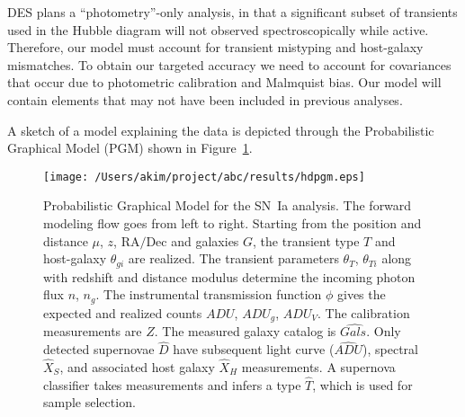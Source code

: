 \documentclass[preprint]{aastex}
\begin{document}
DES plans a ``photometry''-only analysis, in that a significant subset of transients used
in the Hubble diagram will not observed spectroscopically while active.  Therefore,
our model must account for transient mistyping and host-galaxy mismatches.  To obtain
our targeted
accuracy we need to account for covariances that occur due to photometric
calibration and Malmquist bias.  Our model will contain elements that may not
have been included in previous analyses. 

A sketch of a model explaining the data is depicted through the Probabilistic Graphical Model
(PGM)
shown in Figure~\ref{pgm:fig}.

\begin{figure}[htbp] %
   \centering
   \texttt{[image: /Users/akim/project/abc/results/hdpgm.eps]} 
   \caption{Probabilistic Graphical Model for the SN~Ia analysis.  The forward modeling
   flow goes from left to right.  Starting from the position and distance
   $\mu$, $z$, $\text{RA/Dec}$ and galaxies $G$, the transient type $T$ and host-galaxy
   $\theta_{gi}$ are realized. 
   The transient
    parameters $\theta_T$, $\theta_{Ti}$ along
   with redshift and distance modulus determine the incoming photon flux $n$, $n_g$.
   The instrumental transmission function $\phi$ gives the expected and realized
   counts $\mathit{ADU}$, $\mathit{ADU}_g$, $\mathit{ADU}_V$.  The calibration measurements
   are $Z$.  The measured galaxy catalog is $\hat{\mathit{Gals.}}$  Only detected
   supernovae $\hat{D}$ have subsequent light curve ($\hat{ADU}$), spectral
   $\hat{X}_S$, and associated host galaxy $\hat{X}_H$ measurements.  A supernova
   classifier takes measurements and infers a type $\hat{T}$, which is used for sample selection.
   \label{pgm:fig}}
\end{figure}
\end{document}

